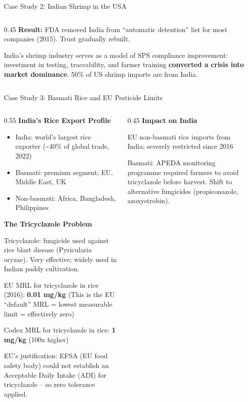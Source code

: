 \documentclass[
  ignorenonframetext,
  aspectratio=169,
]{beamer}
\makeatletter
\providecommand{\tightlist}{%
  \setlength{\itemsep}{0pt}\setlength{\parskip}{0pt}}
\let\quarto@originallabel\label
\DeclareRobustCommand*{\label}[1]{\quarto@originallabel{#1}}
\makeatother
\begin{document}
\begin{frame}{Case Study 2: Indian Shrimp in the USA}
\begin{columns}[T]
\begin{column}{0.45\linewidth}
\textbf{Result:} FDA removed India from ``automatic detention'' list for
most companies (2015). Trust gradually rebuilt.

India's shrimp industry serves as a model of SPS compliance improvement:
investment in testing, traceability, and farmer training
\textbf{converted a crisis into market dominance}. 50\% of US shrimp
imports are from India.
\end{column}
\end{columns}
\end{frame}

\begin{frame}{Case Study 3: Basmati Rice and EU Pesticide Limits}
\label{case-study-3-basmati-rice-and-eu-pesticide-limits}
\begin{columns}[T]
\begin{column}{0.55\linewidth}
\textbf{India's Rice Export Profile}

\begin{itemize}
\tightlist
\item
  India: world's largest rice exporter (\textasciitilde40\% of global
  trade, 2022)
\item
  Basmati: premium segment; EU, Middle East, UK
\item
  Non-basmati: Africa, Bangladesh, Philippines
\end{itemize}

\textbf{The Tricyclazole Problem}

Tricyclazole: fungicide used against rice blast disease (Pyricularia
oryzae). Very effective; widely used in Indian paddy cultivation.

EU MRL for tricyclazole in rice (2016): \textbf{0.01 mg/kg} (This is the
EU ``default'' MRL = lowest measurable limit = effectively zero)

Codex MRL for tricyclazole in rice: \textbf{1 mg/kg} (100x higher)

EU's justification: EFSA (EU food safety body) could not establish an
Acceptable Daily Intake (ADI) for tricyclazole -- so zero tolerance
applied.
\end{column}

\begin{column}{0.45\linewidth}
\textbf{Impact on India}

EU non-basmati rice imports from India: severely restricted since 2016

Basmati: APEDA monitoring programme required farmers to avoid
tricyclazole before harvest. Shift to alternative fungicides
(propiconazole, azoxystrobin).


\end{column}
\end{columns}
\end{frame}
\end{document}
